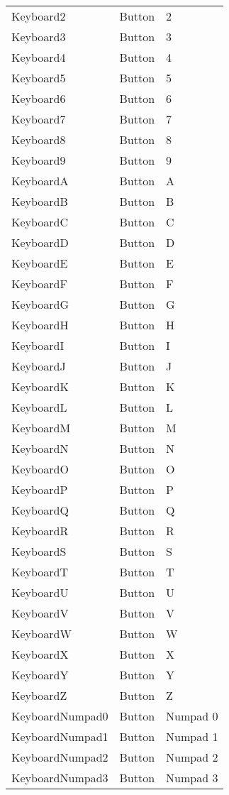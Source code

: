 \begin{center}
\begin{longtable}{ | l | l | p{9cm} |}
	Keyboard2				&	Button	&	2\\
	Keyboard3				&	Button	&	3\\
	Keyboard4				&	Button	&	4\\
	Keyboard5				&	Button	&	5\\
	Keyboard6				&	Button	&	6\\
	Keyboard7				&	Button	&	7\\
	Keyboard8				&	Button	&	8\\
	Keyboard9				&	Button	&	9\\
	KeyboardA				&	Button	&	A\\
	KeyboardB				&	Button	&	B\\
	KeyboardC				&	Button	&	C\\
	KeyboardD				&	Button	&	D\\
	KeyboardE				&	Button	&	E\\
	KeyboardF				&	Button	&	F\\
	KeyboardG				&	Button	&	G\\
	KeyboardH				&	Button	&	H\\
	KeyboardI				&	Button	&	I\\
	KeyboardJ				&	Button	&	J\\
	KeyboardK				&	Button	&	K\\
	KeyboardL				&	Button	&	L\\
	KeyboardM				&	Button	&	M\\
	KeyboardN				&	Button	&	N\\
	KeyboardO				&	Button	&	O\\
	KeyboardP				&	Button	&	P\\
	KeyboardQ				&	Button	&	Q\\
	KeyboardR				&	Button	&	R\\
	KeyboardS				&	Button	&	S\\
	KeyboardT				&	Button	&	T\\
	KeyboardU				&	Button	&	U\\
	KeyboardV				&	Button	&	V\\
	KeyboardW				&	Button	&	W\\
	KeyboardX				&	Button	&	X\\
	KeyboardY				&	Button	&	Y\\
	KeyboardZ				&	Button	&	Z\\
	KeyboardNumpad0			&	Button	&	Numpad 0\\
	KeyboardNumpad1			&	Button	&	Numpad 1\\
	KeyboardNumpad2			&	Button	&	Numpad 2\\
	KeyboardNumpad3			&	Button	&	Numpad 3\\

\end{longtable}
\end{center}
